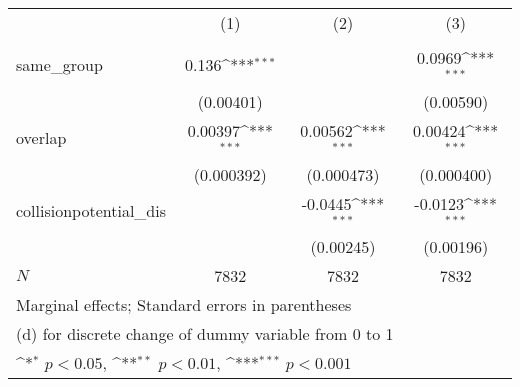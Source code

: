 {
\def\sym#1{\ifmmode^{#1}\else\(^{#1}\)\fi}
\begin{tabular}{l*{3}{c}}
\hline\hline
          &\multicolumn{1}{c}{(1)}&\multicolumn{1}{c}{(2)}&\multicolumn{1}{c}{(3)}\\
          &\multicolumn{1}{c}{}&\multicolumn{1}{c}{}&\multicolumn{1}{c}{}\\
\hline
same\_group&    0.136\sym{***}&                  &   0.0969\sym{***}\\
          &(0.00401)         &                  &(0.00590)         \\
[1em]
overlap   &  0.00397\sym{***}&  0.00562\sym{***}&  0.00424\sym{***}\\
          &(0.000392)         &(0.000473)         &(0.000400)         \\
[1em]
collisionpotential\_dis&                  &  -0.0445\sym{***}&  -0.0123\sym{***}\\
          &                  &(0.00245)         &(0.00196)         \\
\hline
\(N\)     &     7832         &     7832         &     7832         \\
\hline\hline
\multicolumn{4}{l}{\footnotesize Marginal effects; Standard errors in parentheses}\\
\multicolumn{4}{l}{\footnotesize  (d) for discrete change of dummy variable from 0 to 1}\\
\multicolumn{4}{l}{\footnotesize \sym{*} \(p<0.05\), \sym{**} \(p<0.01\), \sym{***} \(p<0.001\)}\\
\end{tabular}
}
